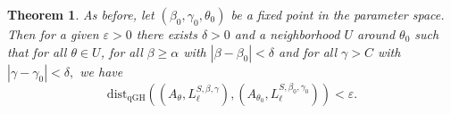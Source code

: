 \documentclass[a4paper,11pt,reqno]{amsart}
\theoremstyle{plain}
\newtheorem{thm}{Theorem}[section]
\theoremstyle{mainthmstyle}
\theoremstyle{named}
\numberwithin{equation}{section}
\begin{document}
\begin{thm} \label{joint continuity qGH}
As before, let $(\beta_0,\gamma_0,\theta_0)$ be a fixed point in the parameter space. Then for a given $\varepsilon > 0$ there exists $\delta > 0$ and a neighborhood $U$ around $\theta_0$ such that for all $\theta \in U$, for all $\beta \geq \alpha$ with $\left \lvert \beta - \beta_0 \right \rvert < \delta$ and for all $\gamma > C$ with $\left \lvert \gamma - \gamma_0 \right \rvert < \delta,$ we have
$$\mathrm{dist}_{\mathrm {qGH}} \left (\left (A_{\theta}, L_{\ell}^{S,\beta, \gamma} \right ), \left (A_{\theta_0}, L_{\ell}^{S,\beta_0,\gamma_0} \right ) \right ) < \varepsilon.$$
\end{thm}
\end{document}
